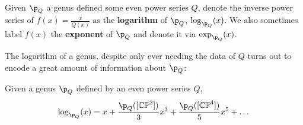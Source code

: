 \begin{definition}
Given $\p_Q$ a genus defined some even power series $Q$, denote the inverse power series of $f(x) = \frac{x}{Q(x)}$ as the \textbf{logarithm} of $\p_Q$, $\log_{\p_Q}(x)$. We also sometimes label  $f(x)$ the \textbf{exponent} of $\p_Q$ and denote it via $\exp_{\p_Q} (x)$.  
\end{definition}

The logarithm of a genus, despite only ever needing the data of $Q$ turns out to encode a great amount of information about $\p_Q$:

\begin{proposition}
    Given a genus $\p_Q$ defined by an even power series $Q$, 
    \[\log_{\p_Q} (x) = x + \frac{\p_Q ([\mathbb{CP}^2])}{3} x^3 + \frac{\p_Q ([\mathbb{CP}^4])}{5} x^5 + \dots\]
\end{proposition}

